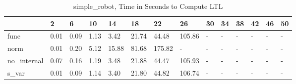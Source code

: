 \begin{table}
\caption{simple_robot, Time in Seconds to Compute LTL}
\label{simple_robot_LTL_time}
\begin{tabular}{llllllllllllll}
\toprule
 & 2 & 6 & 10 & 14 & 18 & 22 & 26 & 30 & 34 & 38 & 42 & 46 & 50 \\
\midrule
func & 0.01 & 0.09 & 1.13 & 3.42 & 21.74 & 44.48 & 105.86 & - & - & - & - & - & - \\
norm & 0.01 & 0.20 & 5.12 & 15.88 & 81.68 & 175.82 & - & - & - & - & - & - & - \\
no_internal & 0.07 & 0.16 & 1.19 & 3.48 & 21.88 & 44.47 & 105.93 & - & - & - & - & - & - \\
s_var & 0.01 & 0.09 & 1.14 & 3.40 & 21.80 & 44.82 & 106.74 & - & - & - & - & - & - \\
\bottomrule
\end{tabular}
\end{table}
